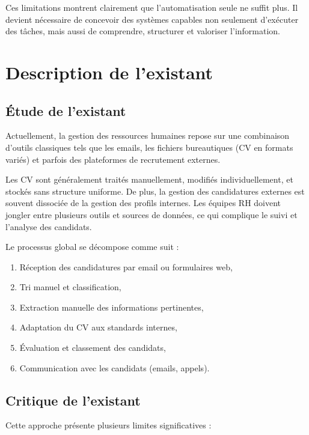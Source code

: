 Ces limitations montrent clairement que l'automatisation seule ne suffit plus. Il devient nécessaire de concevoir des systèmes capables non seulement d'exécuter des tâches, mais aussi de comprendre, structurer et valoriser l'information.


\section{Description de l'existant}
\label{sec:description-existant}

\subsection{Étude de l'existant}
\label{subsec:etude-existant}

Actuellement, la gestion des ressources humaines repose sur une combinaison d'outils classiques tels que les emails, les fichiers bureautiques (CV en formats variés) et parfois des plateformes de recrutement externes.

Les CV sont généralement traités manuellement, modifiés individuellement, et stockés sans structure uniforme. De plus, la gestion des candidatures externes est souvent dissociée de la gestion des profils internes. Les équipes RH doivent jongler entre plusieurs outils et sources de données, ce qui complique le suivi et l'analyse des candidats.

Le processus global se décompose comme suit :

\begin{enumerate}
    \item Réception des candidatures par email ou formulaires web,
    \item Tri manuel et classification,
    \item Extraction manuelle des informations pertinentes,
    \item Adaptation du CV aux standards internes,
    \item Évaluation et classement des candidats,
    \item Communication avec les candidats (emails, appels).
\end{enumerate}


\subsection{Critique de l'existant}
\label{subsec:critique-existant}

Cette approche présente plusieurs limites significatives :

